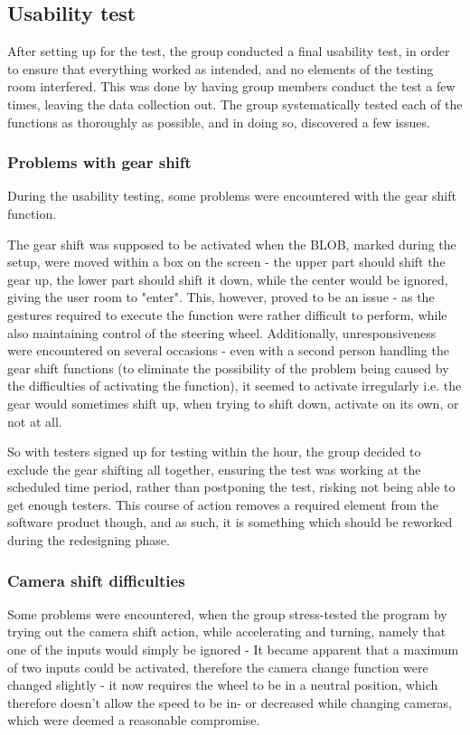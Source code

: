 \subsection{Usability test}
After setting up for the test, the group conducted a final usability test, in order to ensure that everything worked as intended, and no elements of the testing room interfered.
This was done by having group members conduct the test a few times, leaving the data collection out. 
The group systematically tested each of the functions as thoroughly as possible, and in doing so, discovered a few issues.

\subsubsection{Problems with gear shift}
During the usability testing, some problems were encountered with the gear shift function.

The gear shift was supposed to be activated when the BLOB, marked during the setup, were moved within a box on the screen - the upper part should shift the gear up, the lower part should shift it down, while the center would be ignored, giving the user room to "enter". 
This, however, proved to be an issue - as the gestures required to execute the function were rather difficult to perform, while also maintaining control of the steering wheel. 
Additionally, unresponsiveness were encountered on several occasions - even with a second person handling the gear shift functions (to eliminate the possibility of the problem being caused by the difficulties of activating the function), it seemed to activate irregularly i.e. the gear would sometimes shift up, when trying to shift down, activate on its own, or not at all.


So with testers signed up for testing within the hour, the group decided to exclude the gear shifting all together, ensuring the test was working at the scheduled time period, rather than postponing the test, risking not being able to get enough testers. 
This course of action removes a required element from the software product though, and as such, it is something which should be reworked during the redesigning phase.

\subsubsection{Camera shift difficulties}
Some problems were encountered, when the group stress-tested the program by trying out the camera shift action, while accelerating and turning, namely that one of the inputs would simply be ignored - It became apparent that a maximum of two inputs could be activated, therefore the camera change function were changed slightly - it now requires the wheel to be in a neutral position, which therefore doesn't allow the speed to be in- or decreased while changing cameras, which were deemed a reasonable compromise.


